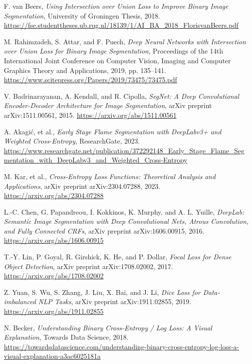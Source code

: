 \documentclass{article}
\begin{document}
\begin{thebibliography}{9}

F. van Beers, 
\textit{Using Intersection over Union Loss to Improve Binary Image Segmentation}, 
University of Groningen Thesis, 2018. 
\url{https://fse.studenttheses.ub.rug.nl/18139/1/AI_BA_2018_FlorisvanBeers.pdf}

M. Rahimzadeh, S. Attar, and F. Puech, 
\textit{Deep Neural Networks with Intersection over Union Loss for Binary Image Segmentation}, 
Proceedings of the 14th International Joint Conference on Computer Vision, Imaging and Computer Graphics Theory and Applications, 2019, pp. 135--141. 
\url{https://www.scitepress.org/Papers/2019/73475/73475.pdf}

V. Badrinarayanan, A. Kendall, and R. Cipolla, 
\textit{SegNet: A Deep Convolutional Encoder-Decoder Architecture for Image Segmentation}, 
arXiv preprint arXiv:1511.00561, 2015.
\url{https://arxiv.org/abs/1511.00561}

A. Akagić, et al., 
\textit{Early Stage Flame Segmentation with DeepLabv3+ and Weighted Cross-Entropy}, 
ResearchGate, 2023. 
\url{https://www.researchgate.net/publication/372292148_Early_Stage_Flame_Segmentation_with_DeepLabv3_and_Weighted_Cross-Entropy}

M. Kar, et al., 
\textit{Cross-Entropy Loss Functions: Theoretical Analysis and Applications}, 
arXiv preprint arXiv:2304.07288, 2023. 
\url{https://arxiv.org/abs/2304.07288}

L.-C. Chen, G. Papandreou, I. Kokkinos, K. Murphy, and A. L. Yuille, 
\textit{DeepLab: Semantic Image Segmentation with Deep Convolutional Nets, Atrous Convolution, and Fully Connected CRFs}, 
arXiv preprint arXiv:1606.00915, 2016. 
\url{https://arxiv.org/abs/1606.00915}

T.-Y. Lin, P. Goyal, R. Girshick, K. He, and P. Dollar, 
\textit{Focal Loss for Dense Object Detection}, 
arXiv preprint arXiv:1708.02002, 2017. 
\url{https://arxiv.org/abs/1708.02002}

Z. Yuan, S. Wu, S. Zhang, J. Liu, X. Bai, and J. Li, 
\textit{Dice Loss for Data-imbalanced NLP Tasks}, 
arXiv preprint arXiv:1911.02855, 2019. 
\url{https://arxiv.org/abs/1911.02855}

N. Becker, 
\textit{Understanding Binary Cross-Entropy / Log Loss: A Visual Explanation}, 
Towards Data Science, 2018. 
\url{https://towardsdatascience.com/understanding-binary-cross-entropy-log-loss-a-visual-explanation-a3ac6025181a}


\end{thebibliography}
\end{document}
